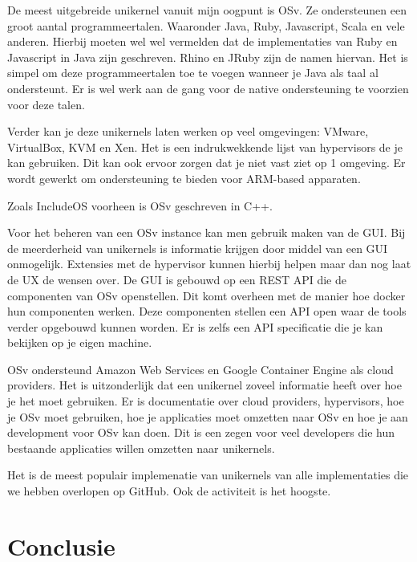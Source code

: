 \documentclass[pdftex,a4paper,12pt,twoside]{report}
\begin{document}
De meest uitgebreide unikernel vanuit mijn oogpunt is OSv. Ze ondersteunen een groot aantal programmeertalen. Waaronder Java, Ruby, Javascript, Scala en vele anderen. Hierbij moeten wel wel vermelden dat de implementaties van Ruby en Javascript in Java zijn geschreven. Rhino en JRuby zijn de namen hiervan. Het is simpel om deze programmeertalen toe te voegen wanneer je Java als taal al ondersteunt. Er is wel werk aan de gang voor de native ondersteuning te voorzien voor deze talen.

Verder kan je deze unikernels laten werken op veel omgevingen: VMware, VirtualBox, KVM en Xen. Het is een indrukwekkende lijst van hypervisors de je kan gebruiken. Dit kan ook ervoor zorgen dat je niet vast ziet op 1 omgeving. Er wordt gewerkt om ondersteuning te bieden voor ARM-based apparaten.

Zoals IncludeOS voorheen is OSv geschreven in C++. 

Voor het beheren van een OSv instance kan men gebruik maken van de GUI. Bij de meerderheid van unikernels is informatie krijgen door middel van een GUI onmogelijk. Extensies met de hypervisor kunnen hierbij helpen maar dan nog laat de UX de wensen over. De GUI is gebouwd op een REST API die de componenten van OSv openstellen. Dit komt overheen met de manier hoe docker hun componenten werken. Deze componenten stellen een API open waar de tools verder opgebouwd kunnen worden. Er is zelfs een API specificatie die je kan bekijken op je eigen machine.

OSv ondersteund Amazon Web Services en Google Container Engine als cloud providers. Het is uitzonderlijk dat een unikernel zoveel informatie heeft over hoe je het moet gebruiken. Er is documentatie over cloud providers, hypervisors, hoe je OSv moet gebruiken, hoe je applicaties moet omzetten naar OSv en hoe je aan development voor OSv kan doen. 
Dit is een zegen voor veel developers die hun bestaande applicaties willen omzetten naar unikernels.

Het is de meest populair implemenatie van unikernels van alle implementaties die we hebben overlopen op GitHub. Ook de activiteit is het hoogste.

\chapter{Conclusie}
\label{ch:conclusie}







\listoffigures
\listoftables
\end{document}

